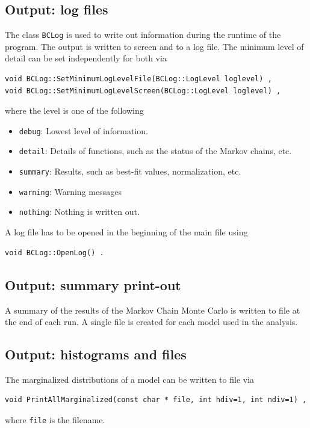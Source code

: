 \documentclass[11pt, a4paper]{article}
\begin{document}
\subsection{Output: log files}

The class \verb|BCLog| is used to write out information during the
runtime of the program. The output is written to screen and to a log
file. The minimum level of detail can be set independently for both
via
%
\begin{verbatim} 
void BCLog::SetMinimumLogLevelFile(BCLog::LogLevel loglevel) , 
void BCLog::SetMinimumLogLevelScreen(BCLog::LogLevel loglevel) , 
\end{verbatim} 
%
\noindent 
where the level is one of the following 
%
\begin{itemize} 
\item \verb|debug|: Lowest level of information. 
\item \verb|detail|: Details of functions, such as the status of the
  Markov chains, etc.
\item \verb|summary|: Results, such as best-fit values, normalization, etc. 
\item \verb|warning|: Warning messages 
\item \verb|nothing|: Nothing is written out. 
\end{itemize} 

A log file has to be opened in the beginning of the main file using
%
\begin{verbatim} 
void BCLog::OpenLog() . 
\end{verbatim} 

\subsection{Output: summary print-out}

A summary of the results of the Markov Chain Monte Carlo is written to
file at the end of each run. A single file is created for each model
used in the analysis. 

\subsection{Output: histograms and files}

The marginalized distributions of a model can be written to file via
%
\begin{verbatim}
void PrintAllMarginalized(const char * file, int hdiv=1, int ndiv=1) ,
\end{verbatim}
%
\noindent 
where \verb|file| is the filename. 
\end{document}
